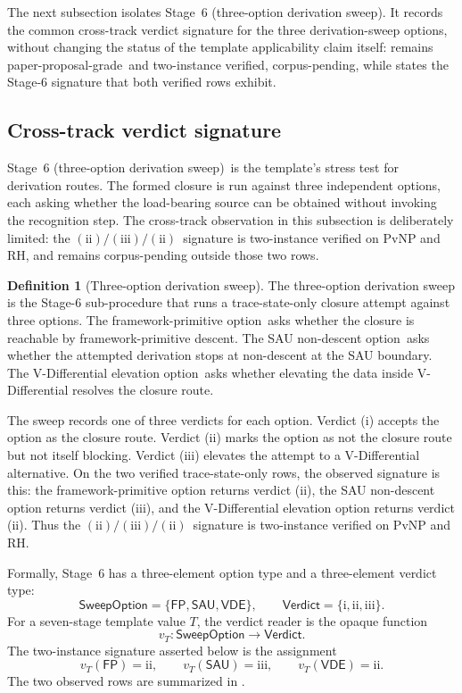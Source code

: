 \documentclass[11pt]{article}
\newcommand{\StageSix}{Stage~6 (three-option derivation sweep)}
\newcommand{\OptFP}{framework-primitive option}
\newcommand{\OptSAU}{SAU non-descent option}
\newcommand{\OptVDE}{V-Differential elevation option}
\newcommand{\SigPattern}{$\mathrm{(ii)}/\mathrm{(iii)}/\mathrm{(ii)}$}
\newcommand{\PPGrade}{paper-proposal-grade}
\newcommand{\TwoInstance}{two-instance verified, corpus-pending}
\theoremstyle{definition}
\newtheorem{definition}[theorem]{Definition}
\begin{document}
The next subsection isolates \StageSix. It records the common
cross-track verdict signature for the three derivation-sweep options,
without changing the status of the template applicability claim itself:
 remains \PPGrade\ and
\TwoInstance, while  states the Stage-6
signature that both verified rows exhibit.

\subsection{Cross-track verdict signature}\label{sec:recognition:verdict-signature}

\StageSix\ is the template's stress test for derivation routes. The
formed closure is run against three independent options, each asking
whether the load-bearing source can be obtained without invoking the
recognition step. The cross-track observation in this subsection is
deliberately limited: the \SigPattern\ signature is two-instance verified
on PvNP and RH, and remains corpus-pending outside those two rows.

\begin{definition}[Three-option derivation sweep]\label{def:three-option-sweep}
The three-option derivation sweep is the Stage-6 sub-procedure that runs a
trace-state-only closure attempt against three options. The \OptFP\ asks
whether the closure is reachable by framework-primitive descent. The
\OptSAU\ asks whether the attempted derivation stops at non-descent at the
SAU boundary. The \OptVDE\ asks whether elevating the data inside
V-Differential resolves the closure route.
\end{definition}

The sweep records one of three verdicts for each option. Verdict (i)
accepts the option as the closure route. Verdict (ii) marks the option as
not the closure route but not itself blocking. Verdict (iii) elevates the
attempt to a V-Differential alternative. On the two verified
trace-state-only rows, the observed signature is this: the
framework-primitive option returns verdict (ii), the SAU non-descent
option returns verdict (iii), and the V-Differential elevation option
returns verdict (ii). Thus the \SigPattern\ signature is two-instance
verified on PvNP and RH.

Formally, Stage~6 has a three-element option type and a three-element
verdict type:
\[
  \mathsf{SweepOption}
    =\{\mathsf{FP},\mathsf{SAU},\mathsf{VDE}\},
  \qquad
  \mathsf{Verdict}=\{\mathrm{i},\mathrm{ii},\mathrm{iii}\}.
\]
For a seven-stage template value \(T\), the verdict reader is the
opaque function
\[
  v_T:\mathsf{SweepOption}\longrightarrow\mathsf{Verdict}.
\]
The two-instance signature asserted below is the assignment
\[
  v_T(\mathsf{FP})=\mathrm{ii},\qquad
  v_T(\mathsf{SAU})=\mathrm{iii},\qquad
  v_T(\mathsf{VDE})=\mathrm{ii}.
\]
The two observed rows are summarized in
.
\end{document}
